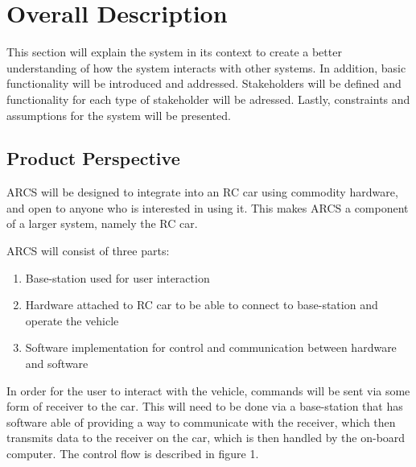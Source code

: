 \documentclass[compsoc,draftclsnofoot,onecolumn,10pt]{IEEEtran}
\begin{document}
\section{Overall Description} %
This section will explain the system in its context to create a better understanding of how the system interacts with other systems.
In addition, basic functionality will be introduced and addressed. 
Stakeholders will be defined and functionality for each type of stakeholder will be adressed. 
Lastly, constraints and assumptions for the system will be presented. 


\subsection{Product Perspective} %
ARCS will be designed to integrate into an RC car using commodity hardware, and open to anyone who is interested in using it. This 
makes ARCS a component of a larger system, namely the RC car. \par
ARCS will consist of three parts: 
\begin{enumerate}
	\item Base-station used for user interaction
	\item Hardware attached to RC car to be able to connect to base-station and 
		operate the vehicle
	\item Software implementation for control and communication between hardware and software
\end{enumerate}
In order for the user to interact with the vehicle, commands will be sent via some form
of receiver to the car. This will need to be done via a base-station that has software able of
providing a way to communicate with the receiver, which then transmits data to the receiver on 
the car, which is then handled by the on-board computer. 
The control flow is described in figure 1. \\
\end{document}
